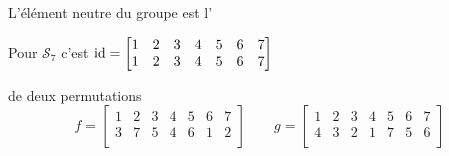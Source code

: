 \begin{frame}
L'élément neutre du groupe est l'

Pour $\mathcal{S}_7$ c'est \quad
$\mathop{\text{id}}\nolimits = \left[\begin{matrix} 
 1 & 2 & 3 & 4 & 5 & 6 & 7 \\  
 1 & 2 & 3 & 4 & 5 & 6 & 7 \\     
        \end{matrix} \right]
$


\pause
\medskip

 de deux permutations
$$f =\left[\begin{matrix} 
 1 & 2 & 3 & 4 & 5 & 6 & 7 \\  
 3 & 7 & 5 & 4 & 6 & 1 & 2 \\      
        \end{matrix} \right]
\qquad 
g = \left[\begin{matrix} 
 1 & 2 & 3 & 4 & 5 & 6 & 7 \\  
 4 & 3 & 2 & 1 & 7 & 5 & 6 \\      
        \end{matrix} \right]
$$

\pause


\end{frame}
